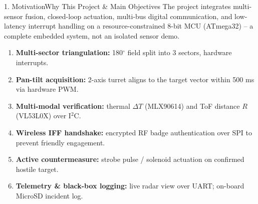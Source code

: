 \documentclass[aspectratio=169, 10pt]{beamer}
\begin{document}
\begin{frame}{1. Motivation}{Why This Project \& Main Objectives}
    \small The project integrates multi-sensor fusion, closed-loop actuation, multi-bus digital communication, and low-latency interrupt handling on a resource-constrained 8-bit MCU (ATmega32) -- a complete embedded system, not an isolated sensor demo.
    \vspace{0.2cm}
    \begin{enumerate}
        \small
        \item \textbf{Multi-sector triangulation:} 180$^\circ$ field split into 3 sectors, hardware interrupts.
        \item \textbf{Pan-tilt acquisition:} 2-axis turret aligns to the target vector within 500 ms via hardware PWM.
        \item \textbf{Multi-modal verification:} thermal $\Delta T$ (MLX90614) and ToF distance $R$ (VL53L0X) over I$^2$C.
        \item \textbf{Wireless IFF handshake:} encrypted RF badge authentication over SPI to prevent friendly engagement.
        \item \textbf{Active countermeasure:} strobe pulse / solenoid actuation on confirmed hostile target.
        \item \textbf{Telemetry \& black-box logging:} live radar view over UART; on-board MicroSD incident log.
    \end{enumerate}
\end{frame}
\end{document}
